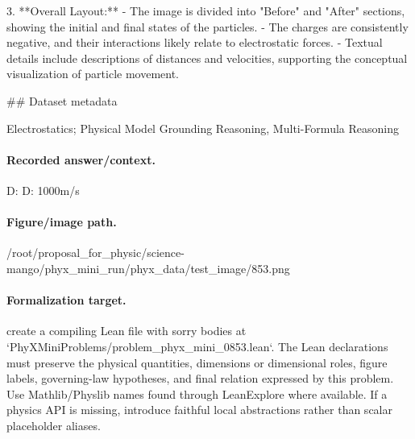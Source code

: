 3. **Overall Layout:**
   - The image is divided into "Before" and "After" sections, showing the initial and final states of the particles.
   - The charges are consistently negative, and their interactions likely relate to electrostatic forces.
   - Textual details include descriptions of distances and velocities, supporting the conceptual visualization of particle movement.

\#\# Dataset metadata

Electrostatics; Physical Model Grounding Reasoning, Multi-Formula Reasoning

\paragraph{Recorded answer/context.}
D: D: 1000m/s

\paragraph{Figure/image path.}
/root/proposal\_for\_physic/science-mango/phyx\_mini\_run/phyx\_data/test\_image/853.png

\paragraph{Formalization target.}
create a compiling Lean file with sorry bodies at `PhyXMiniProblems/problem\_phyx\_mini\_0853.lean`. The Lean declarations must preserve the physical quantities, dimensions or dimensional roles, figure labels, governing-law hypotheses, and final relation expressed by this problem.
Use Mathlib/Physlib names found through LeanExplore where available. If a physics API is missing, introduce faithful local abstractions rather than scalar placeholder aliases.

